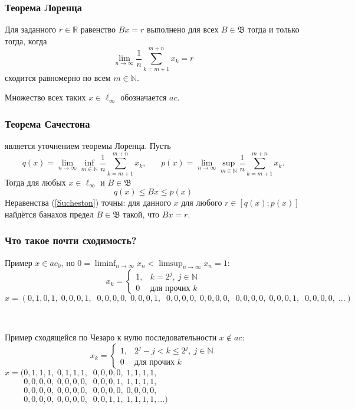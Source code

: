\documentclass[10pt,pdf,hyperref={unicode},aspectratio=169,color={usenames, dvipsnames}]{beamer}\usepackage{amsmath}
\theoremstyle{definition}
\begin{document}
\begin{frame}\frametitle{Теорема Лоренца}
	Для заданного $r\in\mathbb{R}$ равенство $Bx=r$ выполнено для всех $B\in\mathfrak{B}$
	тогда и только тогда, когда
	\begin{equation*}
		\lim_{n\to\infty} \frac{1}{n} \sum_{k=m+1}^{m+n} x_k = r
	\end{equation*}
	сходится равномерно по всем $m\in\mathbb{N}$.

	Множество всех таких $x \in \ell_\infty$ обозначается $ac$.
\end{frame}

\begin{frame}\frametitle{Теорема Сачестона}
	является уточнением теоремы Лоренца.
	Пусть
	\begin{equation*}
		q(x) = \lim_{n\to\infty} \inf_{m\in\mathbb{N}}  \frac{1}{n} \sum_{k=m+1}^{m+n} x_k,
		~~~~~~~~
		p(x) = \lim_{n\to\infty} \sup_{m\in\mathbb{N}}  \frac{1}{n} \sum_{k=m+1}^{m+n} x_k.
	\end{equation*}
	Тогда для любых $x\in \ell_\infty$ и $B\in\mathfrak{B}$
	\begin{equation}\label{Sucheston}
		q(x) \leqslant Bx \leqslant p(x)
	\end{equation}
	Неравенства (\ref{Sucheston}) точны:
	для данного $x$ для любого $r\in[q(x); p(x)]$ найдётся банахов предел
	$B\in\mathfrak{B}$ такой, что $Bx = r$.
\end{frame}

\begin{frame}\frametitle{Что такое почти сходимость?}
	\begin{varwidth}[t]{\linewidth}
		\hspace{3em}
		Пример $x\in ac_0$, но $\displaystyle0=\liminf_{n\to\infty}x_n < \limsup_{n\to\infty}x_n=1$:~~
		$$\displaystyle
			x_k=\begin{cases}
				1, & k=2^j,~j\in\mathbb N
				\\
				0 & \mbox{для прочих~} k
			\end{cases}
		$$
		$x=(0,1,0,1,\;0,0,0,1,\;\;0,0,0,0,\;0,0,0,1,\;\;0,0,0,0,\;0,0,0,0,\;\;0,0,0,0,\;0,0,0,1,\;\;0,0,0,0,\;...)$
	\end{varwidth}
	\\
	\vspace{2em}
	\begin{varwidth}[t]{\linewidth}
		Пример сходящейся по Чезаро к нулю последовательности $x\notin ac$:~~
		$$\displaystyle
			x_k=\begin{cases}
				1, & 2^j-j < k \leq 2^j,~j\in\mathbb N
				\\
				0 & \mbox{для прочих~} k
			\end{cases}
		$$
		$x=(0,1,1,1,\;0,1,1,1,\;\;0,0,0,0,\;1,1,1,1,$\\
		$\phantom{x=(}0,0,0,0,\;0,0,0,0,\;\;0,0,0,1,\;1,1,1,1,$\\
		$\phantom{x=(}0,0,0,0,\;0,0,0,0,\;\;0,0,0,0,\;0,0,0,0,$\\
		$\phantom{x=(}0,0,0,0,\;0,0,0,0,\;\;0,0,1,1,\;1,1,1,1,...)$
	\end{varwidth}
\end{frame}
\end{document}
